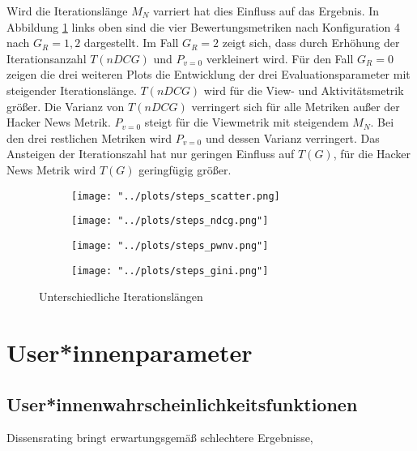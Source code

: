 Wird die Iterationslänge $M_N$ varriert hat dies Einfluss auf das Ergebnis. In Abbildung \ref{fig:steps} links oben sind die vier Bewertungsmetriken nach Konfiguration 4 nach $G_R = {1,2}$ dargestellt. Im Fall $G_R = 2$ zeigt sich, dass durch Erhöhung der Iterationsanzahl $T(nDCG)$ und $P_{v=0}$ verkleinert wird. Für den Fall $G_R = 0$ zeigen die drei weiteren Plots die Entwicklung der drei Evaluationsparameter mit steigender Iterationslänge. $T(nDCG)$ wird für die View- und Aktivitätsmetrik größer. Die Varianz von $T(nDCG)$ verringert sich für alle Metriken außer der Hacker News Metrik. $P_{v=0}$ steigt für die Viewmetrik mit steigendem $M_N$. Bei den drei restlichen Metriken wird $P_{v=0}$ und dessen Varianz verringert. Das Ansteigen der Iterationszahl hat nur geringen Einfluss auf $T(G)$, für die Hacker News Metrik wird $T(G)$ geringfügig größer. 




\begin{figure}[!htb]
	\begin{subfigure}{0.5\textwidth}
		\texttt{[image: "../plots/steps\_scatter.png]}%
	\end{subfigure}
	\hfill
	\begin{subfigure}{0.5\textwidth}
		
		
		\texttt{[image: "../plots/steps\_ndcg.png"]}%

	\end{subfigure}
	\begin{subfigure}{0.5\textwidth}
		\texttt{[image: "../plots/steps\_pwnv.png"]}%
	\end{subfigure}
	\hfill
	\begin{subfigure}{0.5\textwidth}
		\texttt{[image: "../plots/steps\_gini.png"]}%
	\end{subfigure}
	\caption{Unterschiedliche Iterationslängen}
	\label{fig:steps}
\end{figure}



\section{User*innenparameter}

\subsection{User*innenwahrscheinlichkeitsfunktionen}


Dissensrating bringt erwartungsgemäß schlechtere Ergebnisse, 


